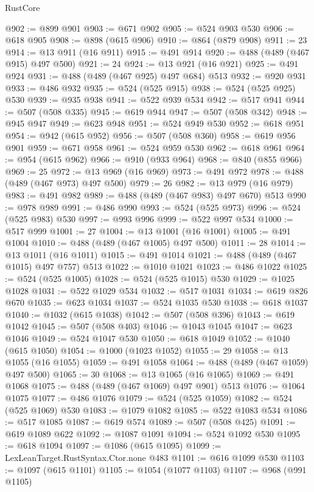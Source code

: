 \begin{lexlean}{RustCore}
\begin{coremodule}
@902 := @899 @901
@903 := @671 @902
@905 := @524 @903 @530
@906 := @618 @905
@908 := @898 (@615 @906)
@910 := @864 (@879 @908)
@911 := 23
@914 := @13 @911 (@16 @911)
@915 := @491 @914
@920 := @488 (@489 (@467 @915) @497 @500)
@921 := 24
@924 := @13 @921 (@16 @921)
@925 := @491 @924
@931 := @488 (@489 (@467 @925) @497 @684) @513
@932 := @920 @931
@933 := @486 @932
@935 := @524 (@525 @915)
@938 := @524 (@525 @925) @530
@939 := @935 @938
@941 := @522 @939 @534
@942 := @517 @941
@944 := @507 (@508 @335)
@945 := @619 @944
@947 := @507 (@508 @342)
@948 := @945 @947
@949 := @623 @948
@951 := @524 @949 @530
@952 := @618 @951
@954 := @942 (@615 @952)
@956 := @507 (@508 @360)
@958 := @619 @956 @901
@959 := @671 @958
@961 := @524 @959 @530
@962 := @618 @961
@964 := @954 (@615 @962)
@966 := @910 (@933 @964)
@968 := @840 (@855 @966)
@969 := 25
@972 := @13 @969 (@16 @969)
@973 := @491 @972
@978 := @488 (@489 (@467 @973) @497 @500)
@979 := 26
@982 := @13 @979 (@16 @979)
@983 := @491 @982
@989 := @488 (@489 (@467 @983) @497 @670) @513
@990 := @978 @989
@991 := @486 @990
@993 := @524 (@525 @973)
@996 := @524 (@525 @983) @530
@997 := @993 @996
@999 := @522 @997 @534
@1000 := @517 @999
@1001 := 27
@1004 := @13 @1001 (@16 @1001)
@1005 := @491 @1004
@1010 := @488 (@489 (@467 @1005) @497 @500)
@1011 := 28
@1014 := @13 @1011 (@16 @1011)
@1015 := @491 @1014
@1021 := @488 (@489 (@467 @1015) @497 @757) @513
@1022 := @1010 @1021
@1023 := @486 @1022
@1025 := @524 (@525 @1005)
@1028 := @524 (@525 @1015) @530
@1029 := @1025 @1028
@1031 := @522 @1029 @534
@1032 := @517 @1031
@1034 := @619 @826 @670
@1035 := @623 @1034
@1037 := @524 @1035 @530
@1038 := @618 @1037
@1040 := @1032 (@615 @1038)
@1042 := @507 (@508 @396)
@1043 := @619 @1042
@1045 := @507 (@508 @403)
@1046 := @1043 @1045
@1047 := @623 @1046
@1049 := @524 @1047 @530
@1050 := @618 @1049
@1052 := @1040 (@615 @1050)
@1054 := @1000 (@1023 @1052)
@1055 := 29
@1058 := @13 @1055 (@16 @1055)
@1059 := @491 @1058
@1064 := @488 (@489 (@467 @1059) @497 @500)
@1065 := 30
@1068 := @13 @1065 (@16 @1065)
@1069 := @491 @1068
@1075 := @488 (@489 (@467 @1069) @497 @901) @513
@1076 := @1064 @1075
@1077 := @486 @1076
@1079 := @524 (@525 @1059)
@1082 := @524 (@525 @1069) @530
@1083 := @1079 @1082
@1085 := @522 @1083 @534
@1086 := @517 @1085
@1087 := @619 @574
@1089 := @507 (@508 @425)
@1091 := @619 @1089 @622
@1092 := @1087 @1091
@1094 := @524 @1092 @530
@1095 := @618 @1094
@1097 := @1086 (@615 @1095)
@1099 := LexLeanTarget.RustSyntax.Ctor.none @483
@1101 := @616 @1099 @530
@1103 := @1097 (@615 @1101)
@1105 := @1054 (@1077 @1103)
@1107 := @968 (@991 @1105)

\end{coremodule}
\end{lexlean}
